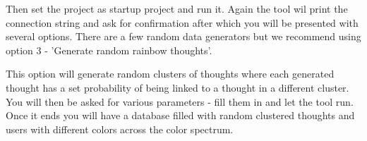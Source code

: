 Then set the project as startup project and run it.
Again the tool wil print the connection string and ask for confirmation after which you will be presented with several options.
There are a few random data generators but we recommend using option 3 - 'Generate random rainbow thoughts'.

This option will generate random clusters of thoughts where each generated thought has a set probability
of being linked to a thought in a different cluster.
You will then be asked for various parameters - fill them in and let the tool run.
Once it ends you will have a database filled with random clustered thoughts
and users with different colors across the color spectrum.